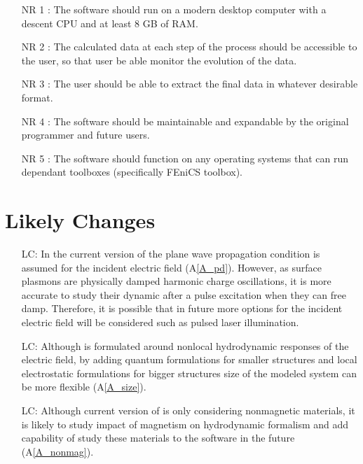 \documentclass[12pt]{article}
\newcounter{lcnum} %
\begin{document}
	\begin{itemize} \item[NR 1 \label{NR_RAM}:] The software should run on a modern
		desktop computer with a descent CPU and at least 8 GB of RAM.
		
		\item[NR 2 \label{NR_data}:] The calculated data at each step of the process
		should be accessible to the user, so that user be able monitor the evolution
		of the data.
		
		\item[NR 3 \label{NR_Output}:] The user should be able to extract the final
		data in whatever desirable format.
		
		\item[NR 4 \label{R_update}:] The software should be maintainable and
		expandable by the original programmer and future users.
		
		\item[NR 5 \label{R_compatibility}:] The software should function on any
		operating systems that can run dependant toolboxes (specifically FEniCS
		toolbox). \end{itemize}
	
	
	\section{Likely Changes}
	
	\noindent \begin{itemize}
		
		\item[LC\refstepcounter{lcnum}\thelcnum\label{LC_lightsource}:] In the current
		version of the \progname{} plane wave propagation condition is assumed for the
		incident electric field (A\ref{A_pd}). However, as surface plasmons are
		physically damped harmonic charge oscillations, it is more accurate to study
		their dynamic after a pulse excitation when they can free damp. Therefore, it is
		possible that in future more options for the incident electric field will be
		considered such as pulsed laser illumination.
		
		\item[LC\refstepcounter{lcnum}\thelcnum\label{LC_size}:] Although \progname{} is
		formulated around nonlocal hydrodynamic responses of the electric field, by
		adding quantum formulations for smaller structures and local electrostatic
		formulations for bigger structures size of the modeled system can be more
		flexible (A\ref{A_size}).
		
		
		\item[LC\refstepcounter{lcnum}\thelcnum\label{LC_magnetism}:] Although current
		version of \progname{} is only considering nonmagnetic materials, it is likely
		to study impact of magnetism on hydrodynamic formalism and add capability of
		study these materials to the software in the future (A\ref{A_nonmag}).
		
	\end{itemize}
	
\end{document}
